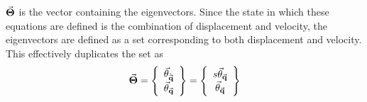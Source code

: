 $ \vec{\mathbf{\Theta}} $ is the vector containing the eigenvectors. Since the state in which these equations are defined is the combination of displacement and velocity, the eigenvectors are defined as a set corresponding to both displacement and velocity. This effectively duplicates the set as
\begin{equation*}
\vec{\mathbf{\Theta}}=\left\{\begin{array}{c}\vec{\mathbf{\theta}}_{\dot{\vec{\mathbf{q}}}}\\\vec{\mathbf{\theta}}_{\vec{\mathbf{q}}}\end{array}\right\}=\left\{\begin{array}{c}s\vec{\mathbf{\theta}}_{\vec{\mathbf{q}}}\\\vec{\mathbf{\theta}}_{\vec{\mathbf{q}}}\end{array}\right\}
\end{equation*}

